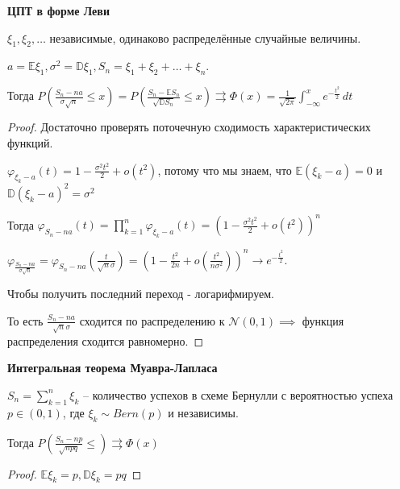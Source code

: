 
\begin{theorem}
    \textbf{ЦПТ в форме Леви}

    $\xi_1, \xi_2, \ldots $ независимые, одинаково распределённые случайные величины.

    $a = \mathbb{E} \xi_1, \sigma^2 = \mathbb{D} \xi_1, S_n = \xi_1 + \xi_2 + \ldots + \xi_n$.

    Тогда $P \left ( \frac{S_n - n a}{\sigma \sqrt{n}} \leqslant x \right ) = P\left ( \frac{S_n - \mathbb{E} S_n}{\sqrt{\mathbb{D} S_n}} \leqslant x \right ) \rightrightarrows \Phi (x) = \frac{1}{\sqrt{2\pi}} \int_{-\infty}^x e^{-\frac{t^2}{2}} \, dt$
\end{theorem}

\begin{proof}
    Достаточно проверять поточечную сходимость характеристических функций.

    $\varphi_{\xi_k - a} (t) = 1 - \frac{\sigma^2 t^2}{2} + o(t^2)$, потому что
    мы знаем, что $\mathbb{E} (\xi_k - a) = 0$ и $\mathbb{D} (\xi_k - a)^2 = \sigma^2$

    Тогда $\varphi_{S_n - na} (t) = \prod\limits_{k = 1}^n \varphi_{\xi_k - a} (t) = \left ( 1 - \frac{\sigma^2t^2}{2} + o(t^2) \right )^n$

    $\varphi_{\frac{S_n - na}{\sigma \sqrt{n}}} = \varphi_{S_n - na} \left ( \frac{t}{\sqrt{n}\sigma} \right ) = \left( 1 - \frac{t^2}{2n} + o \left(\frac{t^2}{n \sigma^2}\right) \right)^n \rightarrow e^{-\frac{t^2}{2}}$.

    Чтобы получить последний переход - логарифмируем.

    То есть $\frac{S_n - na}{\sqrt{n} \sigma}$ сходится по распределению к $\mathcal{N} (0, 1) \implies$ функция распределения сходится равномерно.
\end{proof}

\begin{consequence}
    \textbf{Интегральная теорема Муавра-Лапласа}

    $S_n = \sum_{k=1}^{n} \xi_k$ -- количество успехов в схеме Бернулли с вероятностью успеха $p \in (0, 1)$, где $\xi_k \sim Bern(p)$ и независимы.

    Тогда $P \left( \frac{S_n - np}{\sqrt{npq}} \leqslant \right) \rightrightarrows \Phi (x)$
\end{consequence}

\begin{proof}
    $\mathbb{E} \xi_k = p, \mathbb{D} \xi_k = pq$
\end{proof}


